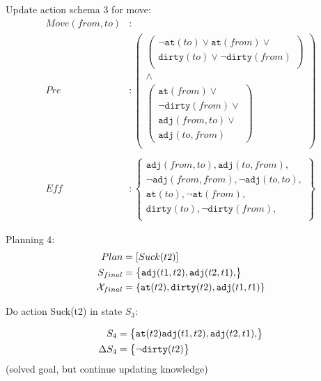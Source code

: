 \documentclass[\master/Master.tex]{subfiles}
\begin{document}
Update action schema 3 for move:
\begin{align*}
	Move(from,to) &: \\
	Pre &:
	\left( 
	\begin{gathered}
		\left(
		\begin{gathered}
			\neg \texttt{at}(to)\lor \texttt{at}(from) \lor \\
			\texttt{dirty}(to)\lor \neg \texttt{dirty}(from) \\
		\end{gathered}
		\right) \\ 
		\land \\
		\left(
		\begin{gathered}
			\texttt{at}(from)\lor \\
			\neg \texttt{dirty}(from)\lor \\
			\texttt{adj}(from,to)\lor   \\
			\texttt{adj}(to,from)
		\end{gathered}
		\right)\\
	\end{gathered}
	\right)\\
	\\
	Eff &: 
	\left\{
	\begin{gathered}
		\texttt{adj}(from,to), \texttt{adj}(to,from), \\
		\neg \texttt{adj}(from,from), \neg \texttt{adj}(to,to), \\					
		\texttt{at}(to), \neg \texttt{at}(from), \\					
		\texttt{dirty}(to), \neg \texttt{dirty}(from), \\
	\end{gathered}
	\right\}
\end{align*}
  
  Planning 4:
  \begin{align*}
  	Plan &= [Suck(t2)]\\
	S_{final} &=  \left\{
	\begin{gathered}
		\texttt{adj}(t1,t2), \texttt{adj}(t2,t1), \\
	\end{gathered}
	\right\}\\
	\mathcal{X}_{final} &= \{\texttt{at}(t2),\texttt{dirty}(t2), \texttt{adj}(t1,t1) \}
  \end{align*}
  
  Do action Suck(t2) in state $S_3$:
  
  \begin{align*}
  	S_4 &= \left\{
  	\begin{gathered}
  		\texttt{at}(t2)
  		\texttt{adj}(t1,t2), \texttt{adj}(t2,t1), \\
  	\end{gathered}
  	\right\}\\
  	\Delta S_4 &= \left\{
  	\begin{gathered}
  		\neg \texttt{dirty}(t2)
  	\end{gathered}
  	\right\}\\ 
  \end{align*}
  (solved goal, but continue updating knowledge)
  
\end{document}
